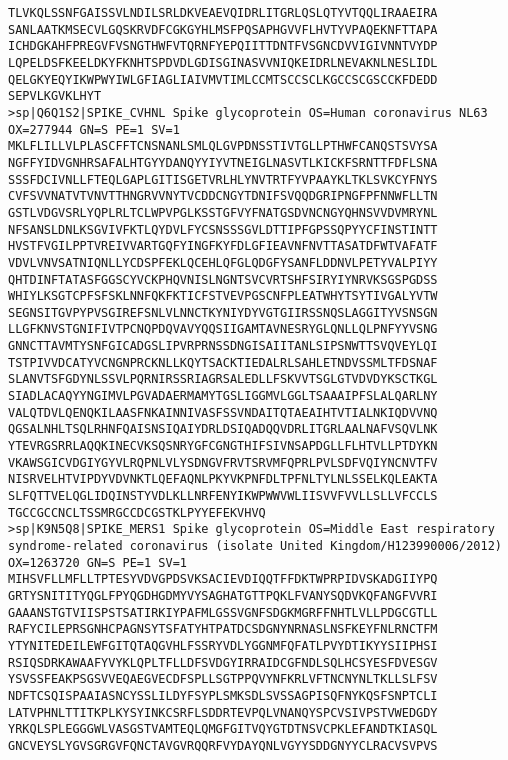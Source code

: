 \documentclass[en,black,12pt,normal]{elegantnote}
\begin{document}
\begin{lstlisting}
TLVKQLSSNFGAISSVLNDILSRLDKVEAEVQIDRLITGRLQSLQTYVTQQLIRAAEIRA
SANLAATKMSECVLGQSKRVDFCGKGYHLMSFPQSAPHGVVFLHVTYVPAQEKNFTTAPA
ICHDGKAHFPREGVFVSNGTHWFVTQRNFYEPQIITTDNTFVSGNCDVVIGIVNNTVYDP
LQPELDSFKEELDKYFKNHTSPDVDLGDISGINASVVNIQKEIDRLNEVAKNLNESLIDL
QELGKYEQYIKWPWYIWLGFIAGLIAIVMVTIMLCCMTSCCSCLKGCCSCGSCCKFDEDD
SEPVLKGVKLHYT
>sp|Q6Q1S2|SPIKE_CVHNL Spike glycoprotein OS=Human coronavirus NL63 OX=277944 GN=S PE=1 SV=1
MKLFLILLVLPLASCFFTCNSNANLSMLQLGVPDNSSTIVTGLLPTHWFCANQSTSVYSA
NGFFYIDVGNHRSAFALHTGYYDANQYYIYVTNEIGLNASVTLKICKFSRNTTFDFLSNA
SSSFDCIVNLLFTEQLGAPLGITISGETVRLHLYNVTRTFYVPAAYKLTKLSVKCYFNYS
CVFSVVNATVTVNVTTHNGRVVNYTVCDDCNGYTDNIFSVQQDGRIPNGFPFNNWFLLTN
GSTLVDGVSRLYQPLRLTCLWPVPGLKSSTGFVYFNATGSDVNCNGYQHNSVVDVMRYNL
NFSANSLDNLKSGVIVFKTLQYDVLFYCSNSSSGVLDTTIPFGPSSQPYYCFINSTINTT
HVSTFVGILPPTVREIVVARTGQFYINGFKYFDLGFIEAVNFNVTTASATDFWTVAFATF
VDVLVNVSATNIQNLLYCDSPFEKLQCEHLQFGLQDGFYSANFLDDNVLPETYVALPIYY
QHTDINFTATASFGGSCYVCKPHQVNISLNGNTSVCVRTSHFSIRYIYNRVKSGSPGDSS
WHIYLKSGTCPFSFSKLNNFQKFKTICFSTVEVPGSCNFPLEATWHYTSYTIVGALYVTW
SEGNSITGVPYPVSGIREFSNLVLNNCTKYNIYDYVGTGIIRSSNQSLAGGITYVSNSGN
LLGFKNVSTGNIFIVTPCNQPDQVAVYQQSIIGAMTAVNESRYGLQNLLQLPNFYYVSNG
GNNCTTAVMTYSNFGICADGSLIPVRPRNSSDNGISAIITANLSIPSNWTTSVQVEYLQI
TSTPIVVDCATYVCNGNPRCKNLLKQYTSACKTIEDALRLSAHLETNDVSSMLTFDSNAF
SLANVTSFGDYNLSSVLPQRNIRSSRIAGRSALEDLLFSKVVTSGLGTVDVDYKSCTKGL
SIADLACAQYYNGIMVLPGVADAERMAMYTGSLIGGMVLGGLTSAAAIPFSLALQARLNY
VALQTDVLQENQKILAASFNKAINNIVASFSSVNDAITQTAEAIHTVTIALNKIQDVVNQ
QGSALNHLTSQLRHNFQAISNSIQAIYDRLDSIQADQQVDRLITGRLAALNAFVSQVLNK
YTEVRGSRRLAQQKINECVKSQSNRYGFCGNGTHIFSIVNSAPDGLLFLHTVLLPTDYKN
VKAWSGICVDGIYGYVLRQPNLVLYSDNGVFRVTSRVMFQPRLPVLSDFVQIYNCNVTFV
NISRVELHTVIPDYVDVNKTLQEFAQNLPKYVKPNFDLTPFNLTYLNLSSELKQLEAKTA
SLFQTTVELQGLIDQINSTYVDLKLLNRFENYIKWPWWVWLIISVVFVVLLSLLVFCCLS
TGCCGCCNCLTSSMRGCCDCGSTKLPYYEFEKVHVQ
>sp|K9N5Q8|SPIKE_MERS1 Spike glycoprotein OS=Middle East respiratory syndrome-related coronavirus (isolate United Kingdom/H123990006/2012) OX=1263720 GN=S PE=1 SV=1
MIHSVFLLMFLLTPTESYVDVGPDSVKSACIEVDIQQTFFDKTWPRPIDVSKADGIIYPQ
GRTYSNITITYQGLFPYQGDHGDMYVYSAGHATGTTPQKLFVANYSQDVKQFANGFVVRI
GAAANSTGTVIISPSTSATIRKIYPAFMLGSSVGNFSDGKMGRFFNHTLVLLPDGCGTLL
RAFYCILEPRSGNHCPAGNSYTSFATYHTPATDCSDGNYNRNASLNSFKEYFNLRNCTFM
YTYNITEDEILEWFGITQTAQGVHLFSSRYVDLYGGNMFQFATLPVYDTIKYYSIIPHSI
RSIQSDRKAWAAFYVYKLQPLTFLLDFSVDGYIRRAIDCGFNDLSQLHCSYESFDVESGV
YSVSSFEAKPSGSVVEQAEGVECDFSPLLSGTPPQVYNFKRLVFTNCNYNLTKLLSLFSV
NDFTCSQISPAAIASNCYSSLILDYFSYPLSMKSDLSVSSAGPISQFNYKQSFSNPTCLI
LATVPHNLTTITKPLKYSYINKCSRFLSDDRTEVPQLVNANQYSPCVSIVPSTVWEDGDY
YRKQLSPLEGGGWLVASGSTVAMTEQLQMGFGITVQYGTDTNSVCPKLEFANDTKIASQL
GNCVEYSLYGVSGRGVFQNCTAVGVRQQRFVYDAYQNLVGYYSDDGNYYCLRACVSVPVS

\end{lstlisting}
\end{document}
